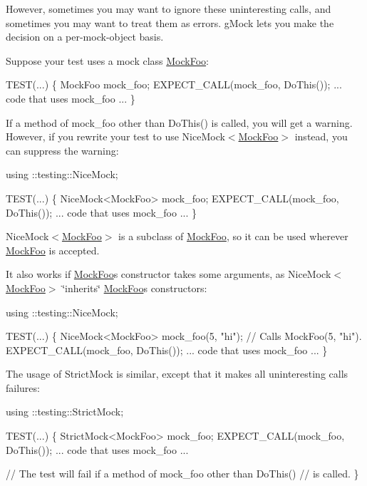 However, sometimes you may want to ignore these uninteresting calls, and sometimes you may want to treat them as errors. g\+Mock lets you make the decision on a per-\/mock-\/object basis.

Suppose your test uses a mock class {\ttfamily \mbox{\hyperlink{classMockFoo}{Mock\+Foo}}}\+:


\begin{DoxyCode}
TEST(...) \{
  MockFoo mock\_foo;
  EXPECT\_CALL(mock\_foo, DoThis());
  ... code that uses mock\_foo ...
\}
\end{DoxyCode}


If a method of {\ttfamily mock\+\_\+foo} other than {\ttfamily Do\+This()} is called, you will get a warning. However, if you rewrite your test to use {\ttfamily Nice\+Mock$<$\mbox{\hyperlink{classMockFoo}{Mock\+Foo}}$>$} instead, you can suppress the warning\+:


\begin{DoxyCode}
using ::testing::NiceMock;

TEST(...) \{
  NiceMock<MockFoo> mock\_foo;
  EXPECT\_CALL(mock\_foo, DoThis());
  ... code that uses mock\_foo ...
\}
\end{DoxyCode}


{\ttfamily Nice\+Mock$<$\mbox{\hyperlink{classMockFoo}{Mock\+Foo}}$>$} is a subclass of {\ttfamily \mbox{\hyperlink{classMockFoo}{Mock\+Foo}}}, so it can be used wherever {\ttfamily \mbox{\hyperlink{classMockFoo}{Mock\+Foo}}} is accepted.

It also works if {\ttfamily \mbox{\hyperlink{classMockFoo}{Mock\+Foo}}}\textquotesingle{}s constructor takes some arguments, as {\ttfamily Nice\+Mock$<$\mbox{\hyperlink{classMockFoo}{Mock\+Foo}}$>$} \char`\"{}inherits\char`\"{} {\ttfamily \mbox{\hyperlink{classMockFoo}{Mock\+Foo}}}\textquotesingle{}s constructors\+:


\begin{DoxyCode}
using ::testing::NiceMock;

TEST(...) \{
  NiceMock<MockFoo> mock\_foo(5, \textcolor{stringliteral}{"hi"});  \textcolor{comment}{// Calls MockFoo(5, "hi").}
  EXPECT\_CALL(mock\_foo, DoThis());
  ... code that uses mock\_foo ...
\}
\end{DoxyCode}


The usage of {\ttfamily Strict\+Mock} is similar, except that it makes all uninteresting calls failures\+:


\begin{DoxyCode}
using ::testing::StrictMock;

TEST(...) \{
  StrictMock<MockFoo> mock\_foo;
  EXPECT\_CALL(mock\_foo, DoThis());
  ... code that uses mock\_foo ...

  \textcolor{comment}{// The test will fail if a method of mock\_foo other than DoThis()}
  \textcolor{comment}{// is called.}
\}
\end{DoxyCode}


